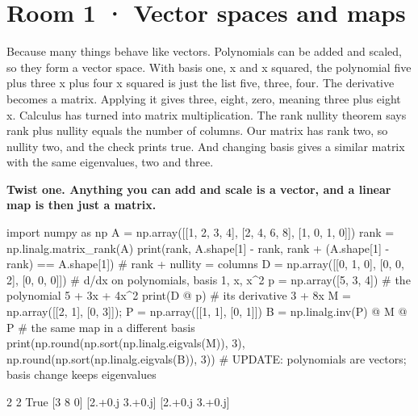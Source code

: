 \documentclass[11pt,a4paper]{report}
\begin{document}
\section*{Room 1 · Vector spaces and maps}
Because many things behave like vectors. Polynomials can be added and scaled, so they form a vector space. With basis one, x and x squared, the polynomial five plus three x plus four x squared is just the list five, three, four. The derivative becomes a matrix. Applying it gives three, eight, zero, meaning three plus eight x. Calculus has turned into matrix multiplication. The rank nullity theorem says rank plus nullity equals the number of columns. Our matrix has rank two, so nullity two, and the check prints true. And changing basis gives a similar matrix with the same eigenvalues, two and three.
\begin{tcolorbox}[colback=yellow!12,colframe=orange!70!black,boxrule=0.4pt,left=4pt,right=4pt,top=2pt,bottom=2pt]\textbf{Twist one. Anything you can add and scale is a vector, and a linear map is then just a matrix.}\end{tcolorbox}
\begin{Code}
import numpy as np
A = np.array([[1, 2, 3, 4], [2, 4, 6, 8], [1, 0, 1, 0]])
rank = np.linalg.matrix_rank(A)
print(rank, A.shape[1] - rank, rank + (A.shape[1] - rank) == A.shape[1])   # rank + nullity = columns
D = np.array([[0, 1, 0], [0, 0, 2], [0, 0, 0]])    # d/dx on polynomials, basis 1, x, x^2
p = np.array([5, 3, 4])                     # the polynomial 5 + 3x + 4x^2
print(D @ p)                                # its derivative 3 + 8x
M = np.array([[2, 1], [0, 3]]); P = np.array([[1, 1], [0, 1]])
B = np.linalg.inv(P) @ M @ P                # the same map in a different basis
print(np.round(np.sort(np.linalg.eigvals(M)), 3), np.round(np.sort(np.linalg.eigvals(B)), 3))
# UPDATE: polynomials are vectors; basis change keeps eigenvalues
\end{Code}
\begin{Out}
2 2 True
[3 8 0]
[2.+0.j 3.+0.j] [2.+0.j 3.+0.j]
\end{Out}
\end{document}
